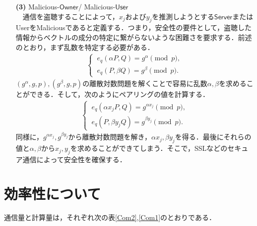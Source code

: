 \documentclass[a4paper]{jsarticle}
\newcommand{\user}{\textsf{User}}
\begin{document}
\begin{enumerate}
\ \ \ \ \ 

\item[\textbf{(3)}] Malicious-$\mathsf{Owner}$/ Malicious-$\mathsf{User}$\ \\
　通信を盗聴することによって，$x_j$および$y_j$を推測しようとする$\mathsf{Server}$または\user をMaliciousであると定義する．つまり，安全性の要件として，盗聴した情報からベクトルの成分の特定に繋がらないような困難さを要求する．前述のとおり，まず乱数を特定する必要がある．
\begin{align}
\begin{cases}
\ e_q(\alpha P,Q) = g^{\alpha} \pmod{p},\\
\ e_q(P,\beta Q) = g^{\beta} \pmod{p}.
\end{cases}
\end{align}
$(g^\alpha, g, p),(g^\beta, g, p)$の離散対数問題を解くことで容易に乱数$\alpha,\beta$を求めることができる．そして，次のようにペアリングの値を計算する．
\begin{align}
\begin{cases}
\ e_q(\alpha x_j P,Q) = g^{\alpha x_j} \pmod{p},\\
\ e_q(P,\beta y_j Q) = g^{\beta y_j} \pmod{p}.
\end{cases}
\end{align}
同様に，$g^{\alpha x_j},g^{\beta y_j}$から離散対数問題を解き，$\alpha x_j,\beta y_j$を得る．最後にそれらの値と$\alpha, \beta$から$x_j,y_j$を求めることができてしまう．そこで，SSLなどのセキュア通信によって安全性を確保する．


\end{enumerate}

\section{効率性について}
通信量と計算量は，それぞれ次の表\ref{Com2},\ref{Com1}のとおりである．
\end{document}
